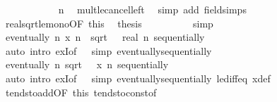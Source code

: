 \begin{isabellebody}
\ \ \ \ \ \ \ \ \isamarkupfalse%
\ {\isacartoucheopen}{}\ {\isacharless}{\kern0pt}\ n{\isacartoucheclose}\ \isamarkupfalse%
\ mult{\isacharunderscore}{\kern0pt}le{\isacharunderscore}{\kern0pt}cancel{\isacharunderscore}{\kern0pt}left\ \isamarkupfalse%
\ {\isacharparenleft}{\kern0pt}simp\ add{\isacharcolon}{\kern0pt}\ field{\isacharunderscore}{\kern0pt}simps{\isacharparenright}{\kern0pt}\isanewline
\ \ \ \ \ \ \isamarkupfalse%
\ real{\isacharunderscore}{\kern0pt}sqrt{\isacharunderscore}{\kern0pt}le{\isacharunderscore}{\kern0pt}mono{\isacharbrackleft}{\kern0pt}OF\ this{\isacharbrackright}{\kern0pt}\ \isamarkupfalse%
\ {\isacharquery}{\kern0pt}thesis\isanewline
\ \ \ \ \ \ \ \ \isamarkupfalse%
\ simp\isanewline
\ \ \ \ \isamarkupfalse%
\isanewline
\ \ \ \ \isamarkupfalse%
\ \isamarkupfalse%
\ {\isachardoublequoteopen}eventually\ {\isacharparenleft}{\kern0pt}{\isasymlambda}n{\isachardot}{\kern0pt}\ x\ n\ {\isasymle}\ sqrt\ {\isacharparenleft}{\kern0pt}{}\ {\isacharslash}{\kern0pt}\ real\ n{\isacharparenright}{\kern0pt}{\isacharparenright}{\kern0pt}\ sequentially{\isachardoublequoteclose}\isanewline
\ \ \ \ \ \ \isamarkupfalse%
\ {\isacharparenleft}{\kern0pt}auto\ intro{\isacharbang}{\kern0pt}{\isacharcolon}{\kern0pt}\ exI{\isacharbrackleft}{\kern0pt}of\ {\isacharunderscore}{\kern0pt}\ {}{\isacharbrackright}{\kern0pt}\ simp{\isacharcolon}{\kern0pt}\ eventually{\isacharunderscore}{\kern0pt}sequentially{\isacharparenright}{\kern0pt}\isanewline
\ \ \ \ \isamarkupfalse%
\ {\isachardoublequoteopen}eventually\ {\isacharparenleft}{\kern0pt}{\isasymlambda}n{\isachardot}{\kern0pt}\ sqrt\ {}\ {\isasymle}\ x\ n{\isacharparenright}{\kern0pt}\ sequentially{\isachardoublequoteclose}\isanewline
\ \ \ \ \ \ \isamarkupfalse%
\ {\isacharparenleft}{\kern0pt}auto\ intro{\isacharbang}{\kern0pt}{\isacharcolon}{\kern0pt}\ exI{\isacharbrackleft}{\kern0pt}of\ {\isacharunderscore}{\kern0pt}\ {}{\isacharbrackright}{\kern0pt}\ simp{\isacharcolon}{\kern0pt}\ eventually{\isacharunderscore}{\kern0pt}sequentially\ le{\isacharunderscore}{\kern0pt}diff{\isacharunderscore}{\kern0pt}eq\ x{\isacharunderscore}{\kern0pt}def{\isacharparenright}{\kern0pt}\isanewline
\ \ \isamarkupfalse%
\isanewline
\ \ \isamarkupfalse%
\ tendsto{\isacharunderscore}{\kern0pt}add{\isacharbrackleft}{\kern0pt}OF\ this\ tendsto{\isacharunderscore}{\kern0pt}const{\isacharbrackleft}{\kern0pt}of\ {}{\isacharbrackright}{\kern0pt}{\isacharbrackright}{\kern0pt}\ \isamarkupfalse%

\end{isabellebody}
